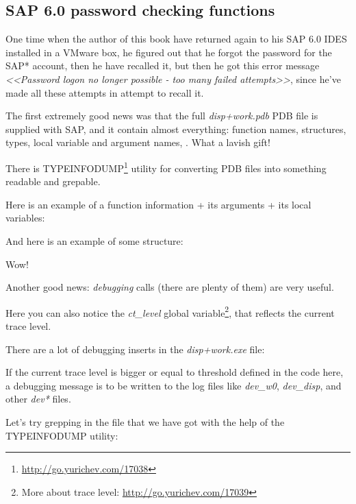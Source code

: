 \subsection{SAP 6.0 password checking functions}


One time when the author of this book have returned again to his SAP 6.0 IDES installed in a VMware box, he figured out that he forgot the password for the SAP* account, then he have recalled it, but then he got this error message 
\emph{<<Password logon no longer possible - too many failed attempts>>}, 
since he've made all these attempts in attempt to recall it.


The first extremely good news was that the full \emph{disp+work.pdb} \gls{PDB} file is supplied with SAP, and it contain almost everything: function names, structures, types, local variable and argument names, \etc{}. What a lavish gift!

There is TYPEINFODUMP\footnote{\url{http://go.yurichev.com/17038}} utility for converting \gls{PDB} files into something readable and grepable.

Here is an example of a function information + its arguments + its local variables:



And here is an example of some structure:



Wow!

Another good news: \emph{debugging} calls (there are plenty of them) are very useful. 

Here you can also notice the \emph{ct\_level} global variable\footnote{More about trace level: \url{http://go.yurichev.com/17039}}, that reflects the current trace level.

There are a lot of debugging inserts in the \emph{disp+work.exe} file:



If the current trace level is bigger or equal to threshold defined in the code here, 
a debugging message is to be written to the log files like \emph{dev\_w0}, \emph{dev\_disp}, 
and other \emph{dev*} files.

\myindex{\GrepUsage}

Let's try grepping in the file that we have got with the help of the TYPEINFODUMP utility:

